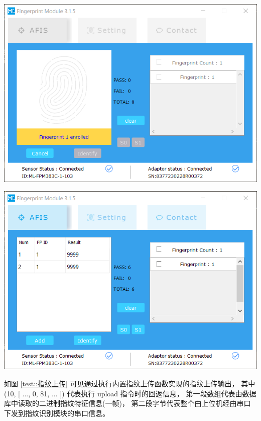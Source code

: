     \noindent
    \begin{minipage}[t]{0.48\linewidth}
        \includegraphics[width=\textwidth]{./imgs/注册指纹.png}
            \label{fig::注册指纹}
    \end{minipage}
    \begin{minipage}[t]{0.48\linewidth}
        \includegraphics[width=\textwidth]{./imgs/测试-指纹上传后查询与匹配.png}
            \label{test::指纹上传后查询与匹配}
    \end{minipage}

    如图 \ref{test::指纹上传} 可见通过执行内置指纹上传函数实现的指纹上传输出，
    其中 (10, [ ..., 0, 81, ... ]) 代表执行 upload 指令时的回返信息，
    第一段数组代表由数据库中读取的二进制指纹特征信息(一帧)，
    第二段字节代表整个由上位机经由串口下发到指纹识别模块的串口信息。


